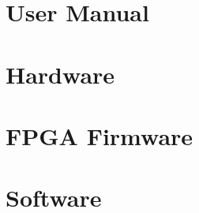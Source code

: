 \documentclass[letterpaper,oneside,10pt]{report}
\begin{document}
\tableofcontents %
\cleardoublepage %

\pagestyle{plain} %







\chapter{User Manual}\label{usermanual}


\chapter{Hardware}\label{hardware}


\chapter{FPGA Firmware}\label{firmware}


\chapter{Software}\label{software}








\clearpage
{}
\listoffigures

\clearpage
{}
\listoftables



\end{document}
